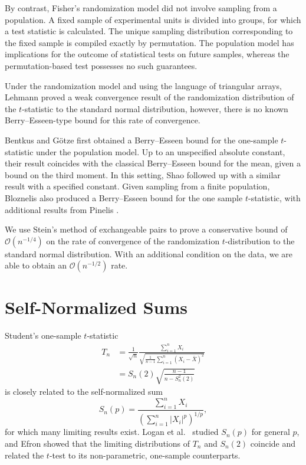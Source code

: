 By contrast, Fisher's randomization model \cite{fisher1935design} did
not involve sampling from a population.  A fixed sample of
experimental units is divided into groups, for which a test statistic
is calculated.  The unique sampling distribution corresponding to the
fixed sample is compiled exactly by permutation.  The population model
has implications for the outcome of statistical tests on future
samples, whereas the permutation-based test possesses no such
guarantees.

Under the randomization model and using the language of triangular
arrays, Lehmann \cite{lehmann1999elements} proved a weak convergence
result of the randomization distribution of the $t$-statistic to the
standard normal distribution, however, there is no known
Berry--Esseen-type bound for this rate of convergence.

Bentkus and G{\"o}tze \cite{bentkus1996berry} first obtained a
Berry--Esseen bound for the one-sample $t$-statistic under the
population model.  Up to an unspecified absolute constant, their result coincides
with the classical Berry--Esseen bound for the mean, given a bound on
the third moment.  In this setting, Shao \cite{shao2005explicit}
followed up with a similar result with a specified constant.  Given
sampling from a finite population, Bloznelis \cite{bloznelis1999berry}
also produced a Berry--Esseen bound for the one sample $t$-statistic,
with additional results from Pinelis \cite{pinelis2011berry}.

We use Stein's method of exchangeable pairs to prove a conservative
bound of $\mathcal{O}(n^{-1/4})$ on the rate of convergence of the randomization
$t$-distribution to the standard normal distribution.  With an
additional condition on the data, we are able to obtain an
$\mathcal{O}(n^{-1/2})$ rate.

\section{Self-Normalized Sums}
Student's one-sample $t$-statistic
\begin{align*}
  T_n &= \frac{1}{\sqrt{n}} \frac{\sum_{i=1}^n X_i}{\sqrt{\frac{1}{n-1} \sum_{i=1}^n(X_i - \bar{X})^2}} \\
  &= S_n(2) \sqrt{\frac{n-1}{n-S_n^2(2)}}
\end{align*}
is closely related to the self-normalized sum
\begin{equation*}
  S_n(p) = \frac{\sum_{i=1}^n X_i}{\left ( \sum_{i=1}^n|X_i|^p \right )^{1/p}},
\end{equation*}
for which many limiting results exist.  Logan et al.\
\cite{logan1973limit} studied $S_n(p)$ for general $p$, and
Efron \cite{efron1969student} showed that the limiting distributions of
$T_n$ and $S_n(2)$ coincide and related the $t$-test to its
non-parametric, one-sample counterparts.

